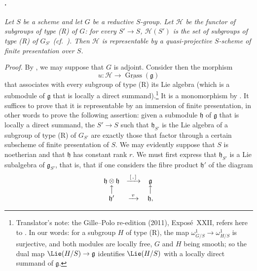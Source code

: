 \paragraph{.}
\textit{Let \(S\) be a scheme and let \(G\) be a reductive
\(S\)-group. Let \(\mathcal H\) be the functor of subgroups of type
\textup{(R)} of \(G\): for every \(S'\to S\),
\(\mathcal H(S')\) is the set of subgroups of type \textup{(R)} of
\(G_{S'}\) \textup{(cf.\ )}. Then \(\mathcal H\) is
representable by a quasi-projective \(S\)-scheme of finite
presentation over \(S\).}

\textit{Proof.}
By , we may suppose that \(G\) is adjoint. Consider
then the morphism
\[
  u\colon
  \mathcal H
  \longrightarrow
  \underline{\operatorname{Grass}}(\mathfrak g)
\]
that associates with every subgroup of type \textup{(R)} its Lie algebra
\textup{(which is a submodule of \(\mathfrak g\) that is locally a direct
summand)}.\footnote{Translator's note: the Gille--Polo re-edition (2011), Exposé~XXII, refers here to
. In our words: for a subgroup \(H\) of type \textup{(R)},
the map \(\omega^1_{G/S}\to\omega^1_{H/S}\) is surjective, and both modules
are locally free, \(G\) and \(H\) being smooth; so the dual map
\(\Lie(H/S)\to\mathfrak g\) identifies \(\Lie(H/S)\) with a locally direct
summand of \(\mathfrak g\).} It is a monomorphism by . It suffices to prove that it is
representable by an immersion of finite presentation, in other words to
prove the following assertion: given a submodule \(\mathfrak h\) of
\(\mathfrak g\) that is locally a direct summand, the \(S'\to S\) such that
\(\mathfrak h_{S'}\) is the Lie algebra of a subgroup of type \textup{(R)} of
\(G_{S'}\) are exactly those that factor through a certain subscheme of
finite presentation of \(S\). We may evidently suppose that \(S\) is
noetherian and that \(\mathfrak h\) has constant rank \(r\). We must first
express that \(\mathfrak h_{S'}\) is a Lie subalgebra of
\(\mathfrak g_{S'}\), that is, that if one considers the fibre product
\(\mathfrak h'\) of the diagram
\[
\begin{array}{ccc}
  \mathfrak h\otimes\mathfrak h & \xrightarrow{\;[\,,\,]\;} & \mathfrak g\\
  \big\uparrow & & \big\uparrow\\
  \mathfrak h' & \xrightarrow{\;v\;} & \mathfrak h,
\end{array}
\]
